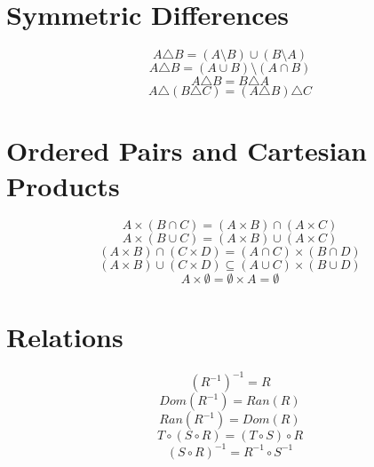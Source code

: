 \documentclass[11pt]{article}
\begin{document}
\section{Symmetric Differences}

$$A \triangle B = (A \setminus B) \cup (B \setminus A)$$
$$A \triangle B = (A \cup B) \setminus (A \cap B)$$
$$A \triangle B = B \triangle A$$
$$A \triangle (B \triangle C) = (A \triangle B) \triangle C$$

\section{Ordered Pairs and Cartesian Products}

$$A \times (B \cap C) = (A \times B) \cap (A \times C)$$
$$A \times (B \cup C) = (A \times B) \cup (A \times C)$$
$$(A \times B) \cap (C \times D) = (A \cap C) \times (B \cap D)$$
$$(A \times B) \cup (C \times D) \subseteq (A \cup C) \times (B \cup D)$$
$$A \times \emptyset = \emptyset \times A = \emptyset$$

\section{Relations}

$$(R^{-1})^{-1} = R$$
$$Dom(R^{-1}) = Ran(R)$$
$$Ran(R^{-1}) = Dom(R)$$
$$T \circ (S \circ R) = (T \circ S) \circ R$$
$$(S \circ R)^{-1} = R^{-1} \circ S^{-1}$$
\end{document}
